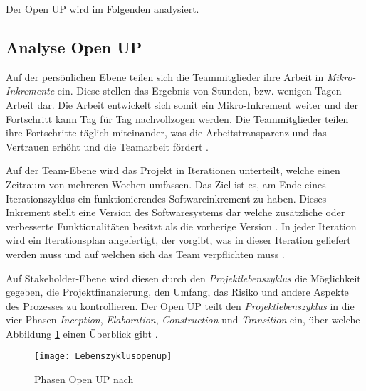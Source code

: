 Der Open UP wird im Folgenden analysiert.

\subsection{Analyse Open UP}


Auf der persönlichen Ebene teilen sich die Teammitglieder ihre Arbeit in \textit{Mikro-Inkremente} ein. Diese stellen das Ergebnis von Stunden, bzw. wenigen Tagen Arbeit dar. Die Arbeit entwickelt sich somit ein Mikro-Inkrement weiter und der Fortschritt kann Tag für Tag nachvollzogen werden. Die Teammitglieder teilen ihre Fortschritte täglich miteinander, was die Arbeitstransparenz und das Vertrauen erhöht und die Teamarbeit fördert \cite{eclipseopenup}. \newline

Auf der Team-Ebene wird das Projekt in Iterationen unterteilt, welche einen Zeitraum von mehreren Wochen umfassen. Das Ziel ist es, am Ende eines Iterationszyklus ein funktionierendes Softwareinkrement zu haben. Dieses Inkrement stellt eine Version des Softwaresystems dar welche zusätzliche oder verbesserte Funktionalitäten besitzt als die vorherige Version \cite{Basem2010}.  In jeder Iteration wird ein Iterationsplan angefertigt,  der vorgibt, was in dieser Iteration geliefert werden muss und auf welchen sich das Team verpflichten muss \cite{freudenreichevaluierung}.

Auf Stakeholder-Ebene wird diesen durch den \textit{Projektlebenszyklus} die Möglichkeit gegeben, die Projektfinanzierung, den Umfang, das Risiko und andere Aspekte des Prozesses zu kontrollieren.
Der Open UP teilt den \textit{Projektlebenszyklus} in die vier Phasen \textit{Inception}, \textit{Elaboration}, \textit{Construction} und \textit{Transition} ein, über welche Abbildung \ref{fig:Phasen} einen Überblick gibt \cite{eclipseopenup}.

\begin{figure}[htp]
\begin{center}
  \texttt{[image: Lebenszyklusopenup]} %
  \caption{Phasen Open UP nach \cite{eclipseopenup}}
  \label{fig:Phasen}
\end{center}
\end{figure}


